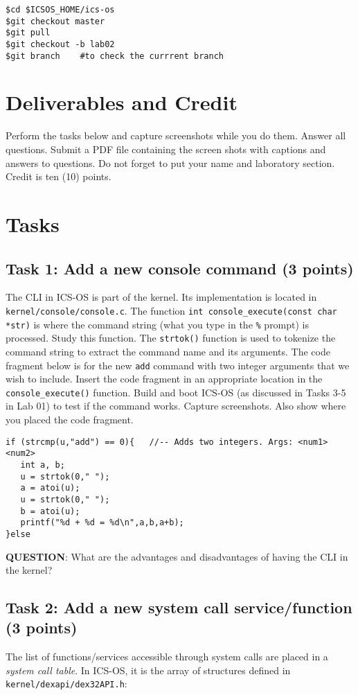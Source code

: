 \documentclass[a4paper, 11pt,oneside]{article}
\begin{document}
\begin{verbatim}
$cd $ICSOS_HOME/ics-os
$git checkout master
$git pull
$git checkout -b lab02
$git branch    #to check the currrent branch
\end{verbatim}


\section{Deliverables and Credit}
Perform the tasks below and capture screenshots while you do them. Answer
all questions. Submit a PDF file containing the screen shots with captions
and answers to questions. Do not forget to put your name and laboratory
section.  Credit is ten (10) points.

\section{Tasks}

\subsection*{Task 1: Add a new console command (3 points)} 
The CLI in ICS-OS is part of the kernel. Its implementation is located in
\texttt{kernel/console/console.c}. The function \texttt{int 
console\_execute(const char *str)} is where the command string (what you type
in the \texttt{\%} prompt) is processed. Study this function. The 
\texttt{strtok()} function is used to tokenize the command string to extract
the command name and its arguments. The code fragment below is for the new
\texttt{add} command with two integer arguments that we wish to include.
Insert the code fragment in an appropriate location in the 
\texttt{console\_execute()} function. Build and boot ICS-OS (as discussed in 
Tasks 3-5 in Lab 01) to test if the command works. Capture screenshots. Also 
show where you placed the code fragment. 

\begin{verbatim}
if (strcmp(u,"add") == 0){   //-- Adds two integers. Args: <num1> <num2> 
   int a, b; 
   u = strtok(0," "); 
   a = atoi(u);
   u = strtok(0," "); 
   b = atoi(u); 
   printf("%d + %d = %d\n",a,b,a+b); 
}else
\end{verbatim}

\textbf{QUESTION}: What are the advantages and disadvantages of having the CLI 
in the kernel?

\subsection*{Task 2: Add a new system call service/function (3 points)}
The list of functions/services accessible through system calls are placed in a
\textit{system call table}. In ICS-OS, it is the array of structures 
defined in \texttt{kernel/dexapi/dex32API.h}: 
\end{document}
